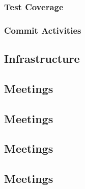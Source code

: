 \subsubsection{Test Coverage}
\subsubsection{Commit Activities}
\subsection{Infrastructure}

\subsection{Meetings}
\subsection{Meetings}
\subsection{Meetings}
\subsection{Meetings}
